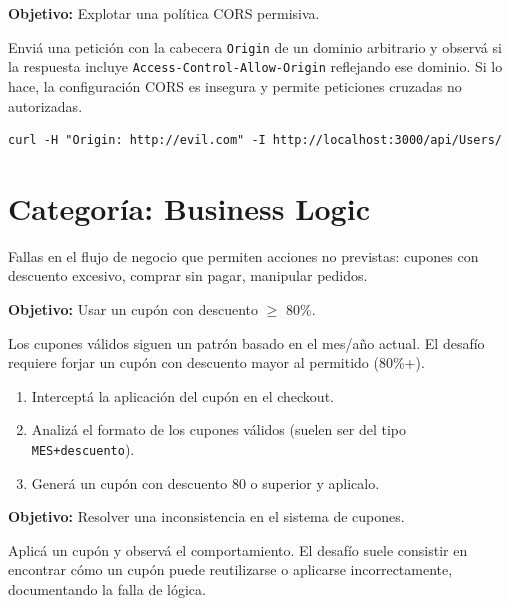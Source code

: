 \documentclass[11pt,a4paper]{article}
\begin{document}
\begin{desafio}
\textbf{Objetivo:} Explotar una política CORS permisiva.
\begin{solucion}
Enviá una petición con la cabecera \texttt{Origin} de un dominio arbitrario y observá si la respuesta incluye \texttt{Access-Control-Allow-Origin} reflejando ese dominio. Si lo hace, la configuración CORS es insegura y permite peticiones cruzadas no autorizadas.
\begin{lstlisting}
curl -H "Origin: http://evil.com" -I http://localhost:3000/api/Users/
\end{lstlisting}
\end{solucion}
\end{desafio}

\section{Categoría: Business Logic}

\begin{teoria}
Fallas en el flujo de negocio que permiten acciones no previstas: cupones con descuento excesivo, comprar sin pagar, manipular pedidos.
\end{teoria}

\begin{desafio}
\textbf{Objetivo:} Usar un cupón con descuento $\geq$ 80\%.
\begin{solucion}
Los cupones válidos siguen un patrón basado en el mes/año actual. El desafío requiere forjar un cupón con descuento mayor al permitido (80\%+).
\begin{enumerate}[leftmargin=*]
  \item Interceptá la aplicación del cupón en el checkout.
  \item Analizá el formato de los cupones válidos (suelen ser del tipo \texttt{MES+descuento}).
  \item Generá un cupón con descuento 80 o superior y aplicalo.
\end{enumerate}
\end{solucion}
\end{desafio}

\begin{desafio}
\textbf{Objetivo:} Resolver una inconsistencia en el sistema de cupones.
\begin{solucion}
Aplicá un cupón y observá el comportamiento. El desafío suele consistir en encontrar cómo un cupón puede reutilizarse o aplicarse incorrectamente, documentando la falla de lógica.
\end{solucion}
\end{desafio}
\end{document}
